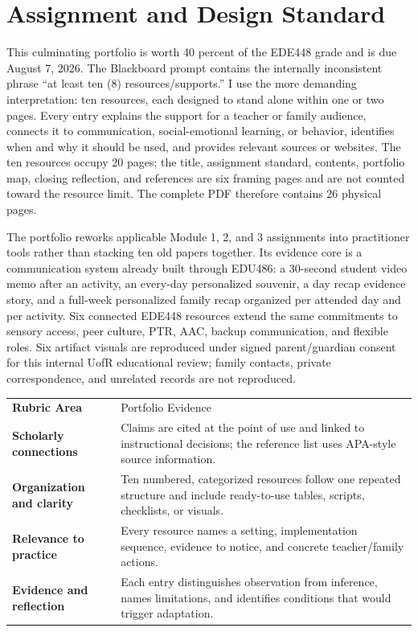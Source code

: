 \documentclass[11pt]{article}
\newcommand{\toolsection}[1]{%
  \Needspace{4\baselineskip}
  \vspace{0.065in}\noindent{\normalsize\bfseries\color{PrimaryRed}#1}
  \par\vspace{0.02in}
}
\begin{document}
\section*{Assignment and Design Standard}

This culminating portfolio is worth 40 percent of the EDE448 grade and is due August 7, 2026. The Blackboard prompt contains the internally inconsistent phrase ``at least ten (8) resources/supports.'' I use the more demanding interpretation: ten resources, each designed to stand alone within one or two pages. Every entry explains the support for a teacher or family audience, connects it to communication, social-emotional learning, or behavior, identifies when and why it should be used, and provides relevant sources or websites. The ten resources occupy 20 pages; the title, assignment standard, contents, portfolio map, closing reflection, and references are six framing pages and are not counted toward the resource limit. The complete PDF therefore contains 26 physical pages.

The portfolio reworks applicable Module 1, 2, and 3 assignments into practitioner tools rather than stacking ten old papers together. Its evidence core is a communication system already built through EDU486: a 30-second student video memo after an activity, an every-day personalized souvenir, a day recap evidence story, and a full-week personalized family recap organized per attended day and per activity. Six connected EDE448 resources extend the same commitments to sensory access, peer culture, PTR, AAC, backup communication, and flexible roles. Six artifact visuals are reproduced under signed parent/guardian consent for this internal UofR educational review; family contacts, private correspondence, and unrelated records are not reproduced.

\toolsection{How the Rubric Is Made Visible}

\renewcommand{\arraystretch}{1.17}
\setlength{\tabcolsep}{5pt}
\begin{tabularx}{\textwidth}{>{\bfseries\RaggedRight\arraybackslash}p{1.70in} >{\RaggedRight\arraybackslash}X}
\rowcolor{PrimaryRed}
\color{white}Rubric Area & \color{white}Portfolio Evidence \\
Scholarly connections & Claims are cited at the point of use and linked to instructional decisions; the reference list uses APA-style source information. \\
\rowcolor{SoftGray}
Organization and clarity & Ten numbered, categorized resources follow one repeated structure and include ready-to-use tables, scripts, checklists, or visuals. \\
Relevance to practice & Every resource names a setting, implementation sequence, evidence to notice, and concrete teacher/family actions. \\
\rowcolor{SoftGray}
Evidence and reflection & Each entry distinguishes observation from inference, names limitations, and identifies conditions that would trigger adaptation. \\
\end{tabularx}
\end{document}

